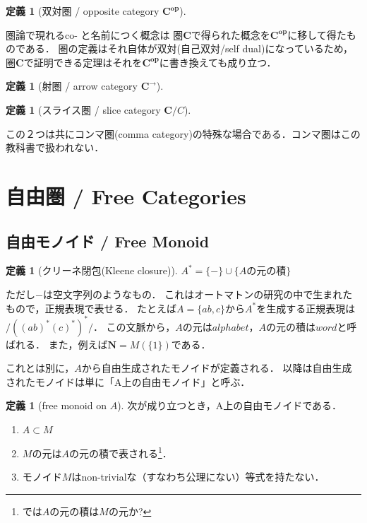 \documentclass[a4j]{jarticle}
\newcommand {\cat}[1]{%
\mathbf{#1}%
}
\theoremstyle{definition}
\newtheorem{definition}[theorem]{定義}
\begin{document}
        \begin{definition}[双対圏 / opposite category $\cat{C^{op}}$]
        \end{definition}
        圏論で現れるco- と名前につく概念は
        圏$\cat{C}$で得られた概念を$\cat{C^{op}}$に移して得たものである．
        圏の定義はそれ自体が双対(自己双対/self dual)になっているため，
        圏$\cat{C}$で証明できる定理はそれを$\cat{C^{op}}$に書き換えても成り立つ．

        \begin{definition}[射圏 / arrow category $\cat{C^{\rightarrow}}$]
        \end{definition}

        \begin{definition}[スライス圏 / slice category $\cat{C}/C$]
        \end{definition}
        この２つは共にコンマ圏(comma category)の特殊な場合である．コンマ圏はこの教科書で扱われない．

    \section{自由圏 / Free Categories}
        \subsection{自由モノイド / Free Monoid}
            \begin{definition}[クリーネ閉包(Kleene closure)]
                $A^{*}=\{ - \} \cup \{ Aの元の積 \}$
            \end{definition}
            ただし$ - $は空文字列のようなもの．
            これはオートマトンの研究の中で生まれたもので，正規表現で表せる．
            たとえば$A=\{ab, c\}$から$A^{*}$を生成する正規表現は$/((ab)^{*}(c)^{*})^{*}/$．
            この文脈から，$A$の元は$alphabet$，$A$の元の積は$word$と呼ばれる．
            また，例えば$\mathbf{N}=M(\{1\})$である．
            
            これとは別に，$A$から自由生成されたモノイドが定義される．
            以降は自由生成されたモノイドは単に「A上の自由モノイド」と呼ぶ．
            \begin{definition}[free monoid on $A$]
                次が成り立つとき，A上の自由モノイドである．
                \begin{enumerate}
                    \item $A \subset M$
                    \item $M$の元は$A$の元の積で表される\footnote{では$A$の元の積は$M$の元か?}．
                    \item モノイド$M$はnon-trivialな（すなわち公理にない）等式を持たない．
                \end{enumerate}
            \end{definition}
\end{document}
